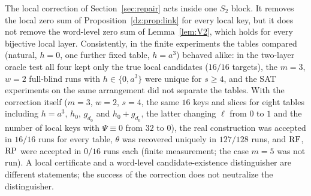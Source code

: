 The local correction of Section~\ref{sec:repair} acts inside one $S_2$ block. It removes the local zero
sum of Proposition~\ref{dz:prop:link} for every local key, but it does not remove the word-level zero sum of
Lemma~\ref{lem:V2}, which holds for every bijective local layer. Consistently, in the finite experiments the
tables compared (natural, $h=0$, one further fixed table, $h=a^3$) behaved alike: in the two-layer oracle test all four kept
only the true local candidates ($16/16$ targets), the $m=3$, $w=2$ full-blind runs with $h\in\{0,a^3\}$ were
unique for $s\ge4$, and the SAT experiments on the same arrangement did not separate the tables. With the correction itself
($m=3$, $w=2$, $s=4$, the same $16$ keys and slices for eight tables including $h=a^3$, $h_0$, $g_{d_0}$ and $h_0+g_{d_0}$, the latter
changing $\ell$ from $0$ to $1$ and the number of local keys with $\Psi\equiv0$ from $32$ to $0$), the real construction was accepted in
$16/16$ runs for every table, $\theta$ was recovered uniquely in $127/128$ runs, and $\mathrm{RF}$, $\mathrm{RP}$ were accepted in $0/16$ runs each
(finite measurement; the case $m=5$ was not run). A local certificate and a word-level candidate-existence distinguisher are
different statements; the success of the correction does not neutralize the distinguisher.
